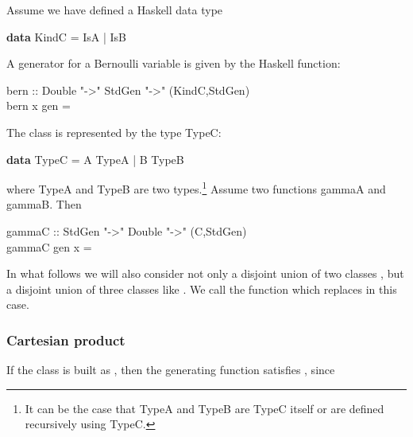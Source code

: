 \documentclass{sig-alternate}
\begin{document}
\begin{figure*}[!t]
Assume we have defined a \textsf{Haskell} data type
\begin{haskell}
  \textbf{data} KindC = IsA | IsB
\end{haskell}
A generator for a Bernoulli variable is given by the \textsf{Haskell} function:
\begin{haskell}
  bern :: Double "->" StdGen "->" (KindC,StdGen)\\
  bern x gen = 
\end{haskell}

The class  is represented by the type \<TypeC\>:
\begin{haskell}
  \textbf{data} TypeC = A TypeA | B TypeB
\end{haskell}
where \<TypeA\> and \<TypeB\> are two types.\footnote{It can be the case that
  \<TypeA\> and \<TypeB\> are \<TypeC\> itself or are defined recursively using
  \<TypeC\>.}  Assume two functions \<gammaA\> and \<gammaB\>.  Then
\begin{normalsize}
  \begin{haskell}
    gammaC :: StdGen "->" Double "->" (C,StdGen)\\
    gammaC gen x = 
  \end{haskell}
\end{normalsize}
In what follows we will also consider not only a disjoint union of two classes , but a disjoint union of three classes like .  We call   the function
which replaces  in this case.

\subsubsection*{Cartesian product}

If the class is built as , then the generating
function satisfies , since


\end{figure*}
\end{document}
